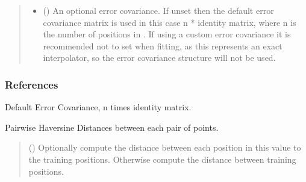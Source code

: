 \documentclass[letterpaper,10pt,english]{sphinxmanual}
\begin{document}
\begin{fulllineitems}
\begin{quote}
\begin{description}
\begin{itemize}
\item {}
\sphinxAtStartPar
{} () \textendash{} An optional error covariance. If unset then the default error covariance
matrix is used \sphinxhyphen{} in this case n * identity matrix, where n is the number
of positions in . If using a custom error covariance it is
recommended not to set  when fitting, as this represents an
exact interpolator, so the error covariance structure will not be used.

\end{itemize}

\end{description}\end{quote}
\subsubsection*{References}

\sphinxAtStartPar
{}

\begin{fulllineitems}
\label{\detokenize{splines:glomar_gridding.spline.SphericalThinPlateSpline.default_error_cov}}
\pysigstartsignatures
\pysigline
{}
\pysigstopsignatures
\sphinxAtStartPar
Default Error Covariance, n times identity matrix.

\end{fulllineitems}


\begin{fulllineitems}
\label{\detokenize{splines:glomar_gridding.spline.SphericalThinPlateSpline.dist_func}}
\pysigstartsignatures
\pysiglinewithargsret
{}
{}
{}
\pysigstopsignatures
\sphinxAtStartPar
Pairwise Haversine Distances between each pair of points.
\begin{quote}\begin{description}
\sphinxAtStartPar
{} () \textendash{} Optionally compute the distance between each position in this value
to the training positions. Otherwise compute the distance between
training positions.


\end{description}
\end{quote}
\end{fulllineitems}
\end{fulllineitems}
\end{document}
